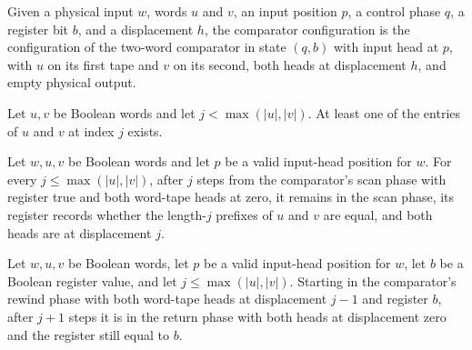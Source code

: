 \begin{definition}
\label{Turing.FinTM.emitterCompareCfg}
\leanok
{}
Given a physical input $w$, words $u$ and $v$, an input position $p$, a
control phase $q$, a register bit $b$, and a displacement $h$, the
comparator configuration is the configuration of the two-word comparator in
state $(q, b)$ with input head at $p$, with $u$ on its first tape and $v$ on
its second, both heads at displacement $h$, and empty physical output.
\end{definition}

\begin{lemma}
\label{Turing.FinTM.emitter_compare_nonblank}
\leanok
{}
Let $u,v$ be Boolean words and let $j<\max(|u|,|v|)$. At least one of the entries of $u$
and $v$ at index $j$ exists.
\end{lemma}

\begin{lemma}
\label{Turing.FinTM.emitter_compare_scan}
\leanok
{}
Let $w,u,v$ be Boolean words and let $p$ be a valid input-head position for $w$. For
every $j\le\max(|u|,|v|)$, after $j$ steps from the comparator's scan phase with
register true and both word-tape heads at zero, it remains in the scan phase, its
register records whether the length-$j$ prefixes of $u$ and $v$ are equal, and both
heads are at displacement $j$.
\end{lemma}

\begin{lemma}
\label{Turing.FinTM.emitter_compare_rewind}
\leanok
{}
Let $w,u,v$ be Boolean words, let $p$ be a valid input-head position for $w$, let $b$ be
a Boolean register value, and let $j\le\max(|u|,|v|)$. Starting in the comparator's
rewind phase with both word-tape heads at displacement $j-1$ and register $b$, after
$j+1$ steps it is in the return phase with both heads at displacement zero and the
register still equal to $b$.
\end{lemma}

